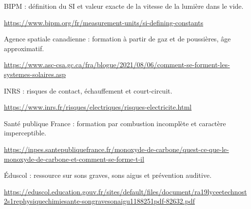 \par\noindent\begin{minipage}{\linewidth}
BIPM : définition du SI et valeur exacte de la vitesse de la lumière dans le vide.\par{\fontsize{8.5}{11}\selectfont\raggedright\url{https://www.bipm.org/fr/measurement-units/si-defining-constants}\par}\end{minipage}\par
{}
\par\noindent\begin{minipage}{\linewidth}
Agence spatiale canadienne : formation à partir de gaz et de poussières, âge approximatif.\par{\fontsize{8.5}{11}\selectfont\raggedright\url{https://www.asc-csa.gc.ca/fra/blogue/2021/08/06/comment-se-forment-les-systemes-solaires.asp}\par}\end{minipage}\par
\par\noindent\begin{minipage}{\linewidth}
INRS : risques de contact, échauffement et court-circuit.\par{\fontsize{8.5}{11}\selectfont\raggedright\url{https://www.inrs.fr/risques/electriques/risques-electricite.html}\par}\end{minipage}\par
\par\noindent\begin{minipage}{\linewidth}
Santé publique France : formation par combustion incomplète et caractère imperceptible.\par{\fontsize{8.5}{11}\selectfont\raggedright\url{https://inpes.santepubliquefrance.fr/monoxyde-de-carbone/quest-ce-que-le-monoxyde-de-carbone-et-comment-se-forme-t-il}\par}\end{minipage}\par
\par\noindent\begin{minipage}{\linewidth}
Éduscol : ressource sur sons graves, sons aigus et prévention auditive.\par{\fontsize{8.5}{11}\selectfont\raggedright\url{https://eduscol.education.gouv.fr/sites/default/files/document/ra19lyceetechnost2s1rephysiquechimiesante-songravesonaigu1188251pdf-82632.pdf}\par}\end{minipage}\par

